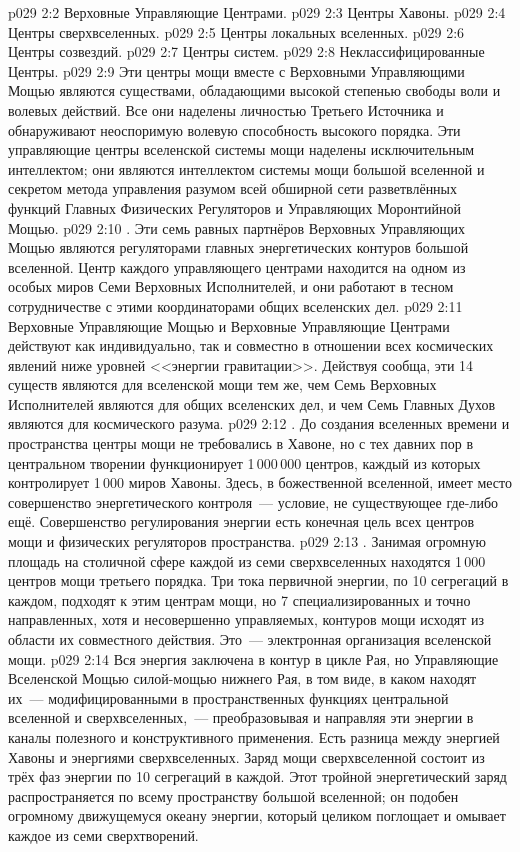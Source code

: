 \vs p029 2:2 Верховные Управляющие Центрами.
\vs p029 2:3 Центры Хавоны.
\vs p029 2:4 Центры сверхвселенных.
\vs p029 2:5 Центры локальных вселенных.
\vs p029 2:6 Центры созвездий.
\vs p029 2:7 Центры систем.
\vs p029 2:8 Неклассифицированные Центры.
\vs p029 2:9 \pc Эти центры мощи вместе с Верховными Управляющими Мощью являются существами, обладающими высокой степенью свободы воли и волевых действий. Все они наделены личностью Третьего Источника и обнаруживают неоспоримую волевую способность высокого порядка. Эти управляющие центры вселенской системы мощи наделены исключительным интеллектом; они являются интеллектом системы мощи большой вселенной и секретом метода управления разумом всей обширной сети разветвлённых функций Главных Физических Регуляторов и Управляющих Моронтийной Мощью.
\vs p029 2:10 . Эти семь равных партнёров Верховных Управляющих Мощью являются регуляторами главных энергетических контуров большой вселенной. Центр каждого управляющего центрами находится на одном из особых миров Семи Верховных Исполнителей, и они работают в тесном сотрудничестве с этими координаторами общих вселенских дел.
\vs p029 2:11 Верховные Управляющие Мощью и Верховные Управляющие Центрами действуют как индивидуально, так и совместно в отношении всех космических явлений ниже уровней <<энергии гравитации>>. Действуя сообща, эти 14 существ являются для вселенской мощи тем же, чем Семь Верховных Исполнителей являются для общих вселенских дел, и чем Семь Главных Духов являются для космического разума.
\vs p029 2:12 . До создания вселенных времени и пространства центры мощи не требовались в Хавоне, но с тех давних пор в центральном творении функционирует 1\,000\,000 центров, каждый из которых контролирует 1\,000 миров Хавоны. Здесь, в божественной вселенной, имеет место совершенство энергетического контроля~--- условие, не существующее где\hyp{}либо ещё. Совершенство регулирования энергии есть конечная цель всех центров мощи и физических регуляторов пространства.
\vs p029 2:13 . Занимая огромную площадь на столичной сфере каждой из семи сверхвселенных находятся 1\,000 центров мощи третьего порядка. Три тока первичной энергии, по 10 сегрегаций в каждом, подходят к этим центрам мощи, но 7 специализированных и точно направленных, хотя и несовершенно управляемых, контуров мощи исходят из области их совместного действия. Это~--- электронная организация вселенской мощи.
\vs p029 2:14 Вся энергия заключена в контур в цикле Рая, но Управляющие Вселенской Мощью  силой\hyp{}мощью нижнего Рая, в том виде, в каком находят их~--- модифицированными в пространственных функциях центральной вселенной и сверхвселенных,~--- преобразовывая и направляя эти энергии в каналы полезного и конструктивного применения. Есть разница между энергией Хавоны и энергиями сверхвселенных. Заряд мощи сверхвселенной состоит из трёх фаз энергии по 10 сегрегаций в каждой. Этот тройной энергетический заряд распространяется по всему пространству большой вселенной; он подобен огромному движущемуся океану энергии, который целиком поглощает и омывает каждое из семи сверхтворений.
